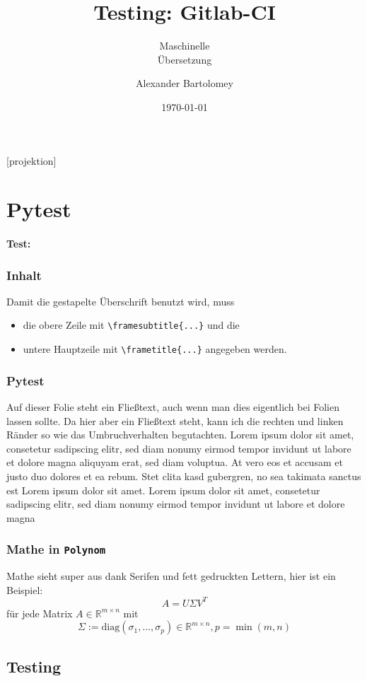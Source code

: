 \documentclass[t]{beamer}
\title{Testing: Gitlab-CI}
\subtitle{Maschinelle\\Übersetzung}
\date[Polynom]{\today}
\author{Alexander Bartolomey}
\institute[Polynom]{Polynom Aachen University}
\begin{document}
[projektion]{}

\begin{frame}[plain]
  \titlepage{}
\end{frame}

\section{Pytest}

\begin{frame}
  \framesubtitle{Test:}
  \frametitle{Inhalt}
  Damit die gestapelte Überschrift benutzt wird, muss \begin{itemize}
    \item die obere Zeile mit \texttt{\textbackslash{}framesubtitle\{...\}} und die
    \item untere Hauptzeile mit \texttt{\textbackslash{}frametitle\{...\}} angegeben werden.
  \end{itemize} 
\end{frame}

\begin{frame}
  \frametitle{Pytest}
  Auf dieser Folie steht ein Fließtext, auch wenn man dies eigentlich
  bei Folien lassen sollte.  Da hier aber ein Fließtext steht, kann
  ich die rechten und linken Ränder so wie das Umbruchverhalten begutachten. 
  Lorem ipsum dolor sit amet, consetetur sadipscing elitr, sed diam nonumy eirmod 
  tempor invidunt ut labore et dolore magna aliquyam erat, sed diam voluptua. 
  At vero eos et accusam et justo duo dolores et ea rebum. Stet clita kasd gubergren, 
  no sea takimata sanctus est Lorem ipsum dolor sit amet. Lorem ipsum dolor sit amet, 
  consetetur sadipscing elitr, sed diam nonumy eirmod tempor invidunt ut labore 
  et dolore magna
\end{frame}

\begin{frame}
  \frametitle{Mathe in \texttt{Polynom}}
  Mathe sieht super aus dank Serifen und fett gedruckten Lettern, hier ist ein Beispiel:
  \[A = U\Sigma V^T\]
  für jede Matrix \(A \in \mathbb{R}^{m\times n}\) mit \[\Sigma:=\mathrm{diag}(\sigma_1,\dots,\sigma_p) \in \mathbb{R}^{m\times n}, p = \min(m,n)\]
\end{frame}

\subsection{Testing}
\end{document}
